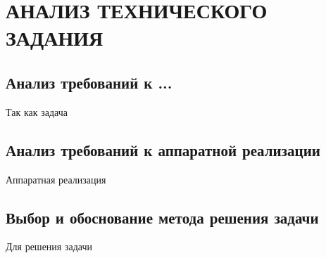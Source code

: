 \chapter[Анализ технического задания]{АНАЛИЗ ТЕХНИЧЕСКОГО ЗАДАНИЯ}

\section{Анализ требований к ...}
\hspace*{12.5 mm}Так как задача 

\section{Анализ требований к аппаратной реализации}
\hspace*{12.5 mm}Аппаратная реализация 

\section{Выбор и обоснование метода решения задачи}
\hspace*{12.5 mm}Для решения задачи 
